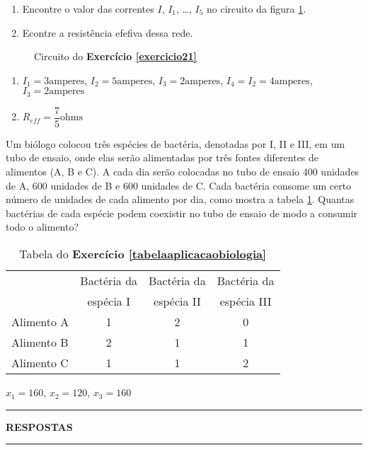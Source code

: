 \documentclass[12pt]{exam}
\begin{document}
\begin{exercicio}\label{exercicio21}
  \begin{enumerate}
    \item Encontre o valor das correntes $I$, $I_1$, \dots, $I_5$ no circuito da figura \ref{exercicio21circuitopoole}.
    \item Econtre a resistência efefiva dessa rede.
  \end{enumerate}
  \begin{figure}
    \centering
    
    \caption{Circuito do \textbf{Exercício \ref{exercicio21}}}
    \label{exercicio21circuitopoole}
  \end{figure}
  \begin{solucao}
    \begin{enumerate}
      \item $I_1 = 3 \mbox{amperes}$, $I_2 = 5 \mbox{amperes}$, $I_3 = 2 \mbox{amperes}$, $I_4 = I_2 =  4\mbox{amperes}$, $I_3 = 2 \mbox{amperes}$
      \item $R_{eff} = \dfrac{7}{5} \mbox{ohms}$
    \end{enumerate}
  \end{solucao}
\end{exercicio}

\begin{exercicio}\label{tabelaaplicacaobiologia}
  Um biólogo colocou três espécies de bactéria, denotadas por I, II e III, em um tubo de ensaio, onde elas serão alimentadas por três fontes diferentes de alimentos (A, B e C). A cada dia serão colocadas no tubo de ensaio 400 unidades de A, 600 unidades de B e 600 unidades de C. Cada bactéria consome um certo número de unidades de cada alimento por dia, como mostra a tabela \ref{tabelabacterias}. Quantas bactérias de cada espécie podem coexistir no tubo de ensaio de modo a consumir todo o alimento?
  \begin{table}[!h]
    \begin{center}
      \begin{tabular}{lccc}
        & Bactéria da & Bactéria da & Bactéria da \\
        & espécia I & espécia II & espécia III\\
        \hline
        Alimento A & 1 & 2 & 0\\
        Alimento B & 2 & 1 & 1\\
        Alimento C & 1 & 1 & 2\\
        \hline
      \end{tabular}
      \caption{Tabela do \textbf{Exercício \ref{tabelaaplicacaobiologia}}}
      \label{tabelabacterias}
    \end{center}
  \end{table}
  \begin{solucao}
    $x_1 = 160$, $x_2 = 120$, $x_3 = 160$
  \end{solucao}
\end{exercicio}

\newpage
{}
\hrule
\begin{center}
{\large\bf RESPOSTAS}
\end{center}
\hrule

\end{document}
